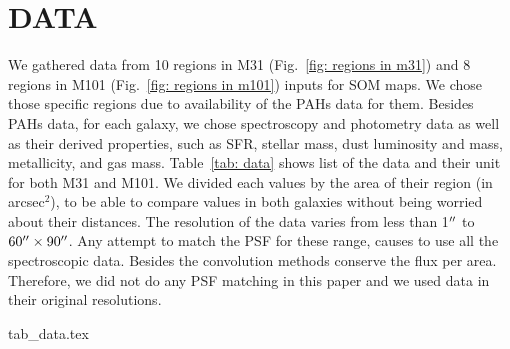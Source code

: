 
\section{DATA}

We gathered data from 10 regions in M31 (Fig.~\ref{fig: regions in m31})  and 8 regions in M101 (Fig.~\ref{fig: regions in m101})  inputs for SOM maps.
We chose those specific regions due to availability of the PAHs data for them.
Besides PAHs data, for each galaxy, we chose spectroscopy and photometry data as well as their derived properties, such as SFR, stellar mass, dust luminosity and mass, metallicity, and gas mass.
Table~\ref{tab: data} shows list of the data and their unit for both M31 and M101.
We divided each values by the area of their region (in arcsec$^2$), to be able to compare values in both galaxies without being worried about their distances.
The resolution of the data varies from less than 1$\hbox{$^{\prime\prime}$}$ to $60\hbox{$^{\prime\prime}$} \times 90 \hbox{$^{\prime\prime}$}$.
Any attempt to match the PSF for these range, causes to use all the spectroscopic data.
Besides the convolution methods conserve the flux per area.
Therefore, we did not do any PSF matching in this paper and we used data in their original resolutions.


{tab_data.tex}


